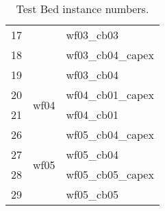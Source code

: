 \begin{table}[!htbp]
\begin{tabular}{lcl}
17     &                               & wf03\_cb03        \\
18     &                               & wf03\_cb04\_capex \\
19     &                               & wf03\_cb04        \\ \hline
20     & \multirow{2}{*}{wf04}         & wf04\_cb01\_capex \\
21     &                               & wf04\_cb01        \\ \hline
26     & \multirow{4}{*}{wf05}         & wf05\_cb04\_capex \\
27     &                               & wf05\_cb04        \\
28     &                               & wf05\_cb05\_capex \\
29     &                               & wf05\_cb05        \\ \hline
\end{tabular}
\caption {Test Bed instance numbers.}
\end{table}
